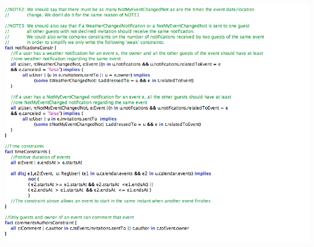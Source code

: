 \documentclass[12pt]{book}
\begin{document}
\includegraphics[width=19cm,height=21cm]{Alloy9}\\
\newpage
\end{document}
